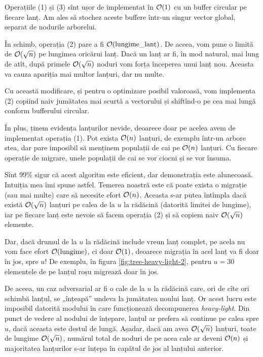 \documentclass[../main.tex]{subfiles}
\begin{document}
Operațiile (1) și (3) sînt ușor de implementat în $\mathcal{O}(1)$ cu un buffer circular pe fiecare lanț. Am ales să stochez aceste buffere într-un singur vector global, separat de nodurile arborelui.

În schimb, operația (2) pare a fi $\mathcal{O}(\textrm{lungime\_lanț})$. De aceea, vom pune o limită de $\mathcal{O}(\sqrt{n})$ pe lungimea oricărui lanț. Dacă un lanț ar fi, în mod natural, mai lung de atît, după primele $\mathcal{O}(\sqrt{n})$ noduri vom forța începerea unui lanț nou. Aceasta va cauza apariția mai multor lanțuri, dar nu multe.

Cu această modificare, și pentru o optimizare posibil valoroasă, vom implementa (2) copiind naiv jumătatea mai scurtă a vectorului și shiftînd-o pe cea mai lungă conform bufferului circular.

În plus, ținem evidența lanțurilor nevide, deoarece doar pe acelea avem de implementat operația (1). Pot exista $\mathcal{O}(n)$ lanțuri, de exemplu într-un arbore stea, dar pare imposibil să menținem populații de cai pe $\mathcal{O}(n)$ lanțuri. Cu fiecare operație de migrare, unele populații de cai se vor ciocni și se vor însuma.

Sînt 99\% sigur că acest algoritm este eficient, dar demonstrația este alunecoasă. Intuiția mea îmi spune astfel. Temerea noastră este că poate exista o migrație (sau mai multe) care să necesite efort $\mathcal{O}(n)$. Aceasta s-ar putea întîmpla dacă există $\mathcal{O}(\sqrt{n})$ lanțuri pe calea de la $u$ la rădăcină (datorită limitei de lungime), iar pe fiecare lanț este nevoie să facem operația (2) și să copiem naiv $\mathcal{O}(\sqrt{n})$ elemente.

Dar, dacă drumul de la $u$ la rădăcină include vreun lanț complet, pe acela nu vom face efort $\mathcal{O}(\textrm{lungime})$, ci doar $\mathcal{O}(1)$, deoarece migrația în acel lanț va fi doar în jos, spre $u$! De exemplu, în figura \ref{fig:tree-heavy-light-2}, pentru $u = 30$ elementele de pe lanțul roșu migrează doar în jos.

De aceea, un caz adversarial ar fi o cale de la $u$ la rădăcină care, ori de cîte ori schimbă lanțul, se „înțeapă” undeva la jumătatea noului lanț. Or acest lucru este imposibil datorită modului în care funcționează decompunerea \textit{heavy-light}. Din punct de vedere al nodului de înțepare, lanțul ar prefera să continue pe calea spre $u$, dacă aceasta este destul de lungă. Așadar, dacă am avea $\mathcal{O}(\sqrt{n})$ lanțuri, toate de lungime $\mathcal{O}(\sqrt{n})$, numărul total de noduri de pe acea cale ar deveni $\mathcal{O}(n)$ și majoritatea lanțurilor s-ar înțepa în capătul de jos al lanțului anterior.
\end{document}
